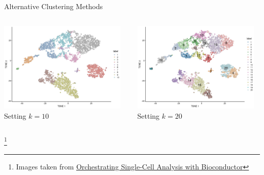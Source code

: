 \documentclass[aspectratio=169,11pt]{beamer}
\newcommand\blfootnote[1]{%
  \begingroup
  \renewcommand\thefootnote{}\footnote{#1}%
  \addtocounter{footnote}{-1}%
  \endgroup
}
\begin{document}
\begin{frame}{Alternative Clustering Methods}
	\begin{columns}[T]
		\begin{column}{.45\textwidth}
			\centering
			\includegraphics[width=0.95\textwidth]{figures/tsne-clust-kmeans-1.png} 
			~\\
			Setting $k = 10$
		\end{column}
		\hfill
		\pause
		\begin{column}{.45\textwidth}
			\centering
			\includegraphics[width=0.95\textwidth]{figures/tsne-clust-kmeans-best-1.png} 
			~\\
			Setting $k=20$
		\end{column}
	\end{columns}
	\blfootnote{Images taken from \href{https://osca.bioconductor.org/}{Orchestrating Single-Cell Analysis with Bioconductor}}
\end{frame}
\end{document}
